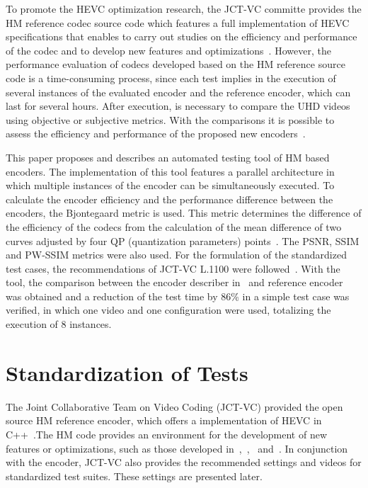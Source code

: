 \documentclass[journal]{IEEEtran}
\begin{document}
To promote the HEVC optimization research, the JCT-VC committe provides the HM reference codec source code which features a full implementation of HEVC specifications that enables to carry out studies on the efficiency and performance of the codec and to develop new features and optimizations~\cite{itu:10}. However, the performance evaluation of codecs developed based on the HM reference source code is a time-consuming process, since each test implies in the execution of several instances of the evaluated encoder and the reference encoder, which can last for several hours. After execution, is necessary to compare the UHD videos using objective or subjective metrics. With the comparisons it is possible to assess the efficiency and performance of the proposed new encoders~\cite{netflix:16}.

This paper proposes and describes an automated testing tool of HM based encoders. The implementation of this tool features a parallel architecture in which multiple instances of the encoder can be simultaneously executed. To calculate the encoder efficiency and the performance difference between the encoders, the Bjontegaard metric is used. This metric determines the difference of the efficiency of the codecs from the calculation of the mean difference of two curves adjusted by four QP (quantization parameters) points~\cite{Bjontegaard:01}. The PSNR, SSIM and PW-SSIM\cite{danilo:15a} metrics were also used. For the formulation of the standardized test cases, the recommendations of JCT-VC L.1100 were followed~\cite{Bossen:15}. With the tool, the comparison between the encoder describer in~\cite{oliveira:16} and reference encoder~\cite{itu:10} was obtained and a reduction of the test time by 86\% in a simple test case was verified, in which one video and one configuration were used, totalizing the execution of 8 instances.


\section{Standardization of Tests}	



The Joint Collaborative Team on Video Coding (JCT-VC) provided the open source HM reference encoder, which offers a implementation of HEVC in C++~\cite{Bossen:15}.The HM code provides an environment for the development of new features or optimizations, such as those developed in~\cite{oliveira:16},~\cite{Yoon:13},~\cite{Correa:12} and~\cite{Weerakkody:14}. In conjunction with the encoder, JCT-VC also provides the recommended settings and videos for standardized test suites. These settings are presented later.
\end{document}
